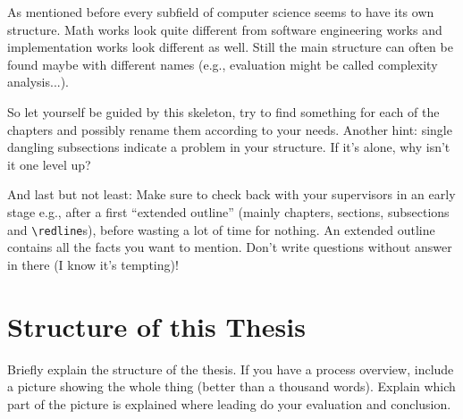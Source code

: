 		As mentioned before every subfield of computer science seems to have its own structure.
		Math works look quite different from software engineering works and implementation works look different as well.
		Still the main structure can often be found maybe with different names (e.g., evaluation might be called complexity analysis...).
		
		So let yourself be guided by this skeleton, try to find something for each of the chapters and possibly rename them according to your needs.
		Another  hint: single dangling subsections indicate a problem in your structure.
		If it's alone, why isn't it one level up?
		
		And last but not least: 
		Make sure to check back with your supervisors in an early stage e.g., after a first ``extended outline'' (mainly chapters, sections, subsections and \verb|\redline|s), before wasting a lot of time for nothing.
		An extended outline contains all the facts you want to mention.
		Don't write questions without answer in there (I know it's tempting)!
	
	\section{Structure of this Thesis}\label{sec:structure} 
		
		Briefly explain the structure of the thesis.
		If you have a process overview, include a picture showing the whole thing (better than a thousand words).
		Explain which part of the picture is explained where leading do your evaluation and conclusion.
		
